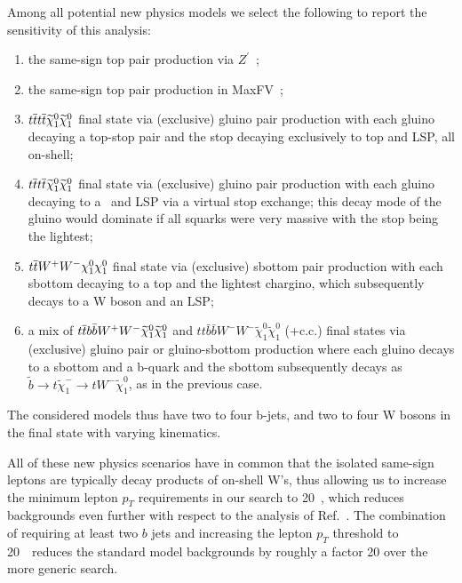 Among all potential new physics models we select the following to report the sensitivity of this analysis:
\begin{enumerate}
\item the same-sign top pair production via $Z^\prime$~\cite{sstop,fcnczprime};

\item the same-sign top pair production in MaxFV~\cite{mxflv3};

\item $t\overline{t} t\overline{t} \widetilde\chi_1^0\widetilde\chi_1^0$ final state via (exclusive) gluino pair production with 
each gluino decaying a top-stop pair and the stop decaying
exclusively to top and LSP, all on-shell;

\item $t\overline{t} t\overline{t} \widetilde\chi_1^0\widetilde\chi_1^0$ final state via (exclusive) gluino pair production with 
each gluino decaying to a \ttbar\ and LSP 
via a virtual stop exchange\cite{T1tttt}; 
this decay mode of the gluino would dominate 
if all squarks were very massive with the stop being the lightest;
\item $t\overline{t} W^+W^- \chi_1^0\chi_1^0 $ final state via (exclusive) sbottom pair production with each 
sbottom decaying to a top and the lightest chargino, which subsequently decays to a W boson and an LSP;
\item a mix of $t\overline{t} b\bar{b} W^+W^- \widetilde\chi_1^0\widetilde\chi_1^0 $ and 
  $tt\bar{b}\bar{b}W^-W^-\tilde{\chi}_1^0\tilde{\chi}_1^0$ (+c.c.) final states via (exclusive) gluino pair or gluino-sbottom
  production where each gluino decays to a sbottom and a b-quark and the sbottom subsequently decays as
  $\widetilde{b} \to t \widetilde{\chi}^-_1 \to t W^- \widetilde{\chi}^0_1  $, as in the previous case.
\end{enumerate}
The considered models thus have two to four b-jets, and two to four W bosons in the final state with varying kinematics.

All of these new physics scenarios have in common that the isolated same-sign leptons are typically decay products of on-shell W's,
thus allowing us to increase the minimum lepton $p_T$ 
requirements in our search to 20~\GeV, which reduces backgrounds even further
with respect to the analysis of Ref.~\cite{sspaper2010,ssnote2011,sspaper2011}.
The combination of requiring at least two $b$ jets and increasing the lepton $p_T$ threshold to 20~\GeV\ reduces the standard model backgrounds
by roughly a factor 20 over the more generic search.


